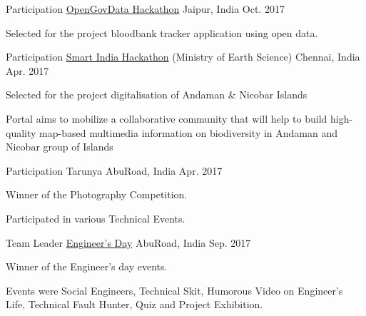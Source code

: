 \begin{cventries}
  \cventry
    {Participation} %
    {\href{https://event.data.gov.in/challenges/opengovdatahack-jaipur/}{OpenGovData Hackathon}} %
    {Jaipur, India} %
    {Oct. 2017} %
    {
      \begin{cvitems} %
        \item {Selected for the project bloodbank tracker application using open data.}
      \end{cvitems}
    }

  \cventry
    {Participation} %
    {\href{https://innovate.mygov.in/sih2017/}{Smart India Hackathon} (Ministry of Earth Science)} %
    {Chennai, India} %
    {Apr. 2017} %
    {
      \begin{cvitems} %
        \item {Selected for the project digitalisation of Andaman \& Nicobar Islands}
        \item {Portal aims to mobilize a collaborative community that will help to build high-quality map-based multimedia information on biodiversity in Andaman and Nicobar group of Islands}
      \end{cvitems}
    }

\end{cventries}

\begin{cventries}
  \cventry
	{Participation} %
	{Tarunya} %
	{AbuRoad, India} %
	{Apr. 2017} %
	{
		\begin{cvitems} %
			\item {Winner of the Photography Competition.}
			\item {Participated in various Technical Events.}
		\end{cvitems}
	}

  \cventry
	{Team Leader}%
	{\href{https://www.facebook.com/citabuinfo/posts/1229195450520361}{Engineer's Day}} %
	{AbuRoad, India} %
	{Sep. 2017} %
	{
		\begin{cvitems} %
			\item {Winner of the Engineer's day events.}
			\item {Events were Social Engineers, Technical Skit, Humorous Video on Engineer’s Life, Technical Fault Hunter, Quiz and Project Exhibition.}
		\end{cvitems}
	}

\end{cventries}